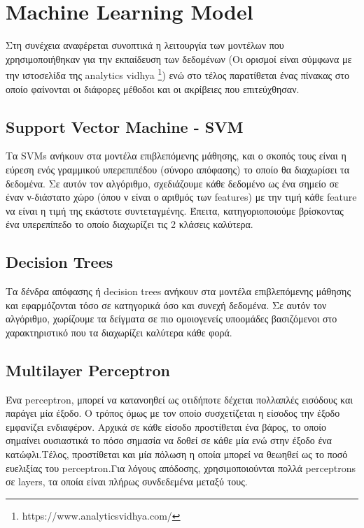 \section{Machine Learning Model}

Στη συνέχεια αναφέρεται συνοπτικά η λειτουργία των μοντέλων που χρησιμοποιήθηκαν για την εκπαίδευση των δεδομένων (Οι ορισμοί είναι σύμφωνα με την ιστοσελίδα της analytics vidhya \footnote{https://www.analyticsvidhya.com/}) ενώ στο τέλος παρατίθεται ένας πίνακας στο οποίο φαίνονται οι διάφορες μέθοδοι και οι ακρίβειες που επιτεύχθησαν.

\subsection{Support Vector Machine - SVM}

Τα SVMs ανήκουν στα μοντέλα επιβλεπόμενης μάθησης, και ο σκοπός τους είναι η εύρεση ενός γραμμικού υπερεπιπέδου (σύνορο απόφασης) το οποίο θα διαχωρίσει τα δεδομένα. Σε αυτόν τον αλγόριθμο, σχεδιάζουμε κάθε δεδομένο ως ένα σημείο σε έναν ν-διάστατο χώρο (όπου ν είναι ο αριθμός των features) με την τιμή κάθε feature να είναι η τιμή της εκάστοτε συντεταγμένης. Έπειτα, κατηγοριοποιούμε βρίσκοντας ένα υπερεπίπεδο το οποίο διαχωρίζει τις 2 κλάσεις καλύτερα.

\subsection{Decision Trees}

Τα δένδρα απόφασης ή decision trees ανήκουν στα μοντέλα επιβλεπόμενης μάθησης και εφαρμόζονται τόσο σε κατηγορικά όσο και συνεχή δεδομένα. Σε αυτόν τον αλγόριθμο, χωρίζουμε τα δείγματα σε πιο ομοιογενείς υποομάδες βασιζόμενοι στο χαρακτηριστικό που τα διαχωρίζει καλύτερα κάθε φορά.

\subsection{Multilayer Perceptron}

Ένα perceptron, μπορεί να κατανοηθεί ως οτιδήποτε δέχεται πολλαπλές εισόδους και παράγει μία έξοδο. Ο τρόπος όμως με τον οποίο συσχετίζεται η είσοδος την έξοδο εμφανίζει ενδιαφέρον. Αρχικά σε κάθε είσοδο προστίθεται ένα βάρος, το οποίο σημαίνει ουσιαστικά το πόσο σημασία να δοθεί σε κάθε μία ενώ στην έξοδο ένα κατώφλι.Τέλος, προστίθεται και μία πόλωση η οποία μπορεί να θεωηθεί ως το ποσό ευελιξίας του perceptron.Για λόγους απόδοσης, χρησιμοποιούνται πολλά perceptrons σε layers, τα οποία είναι πλήρως συνδεδεμένα μεταξύ τους.   

